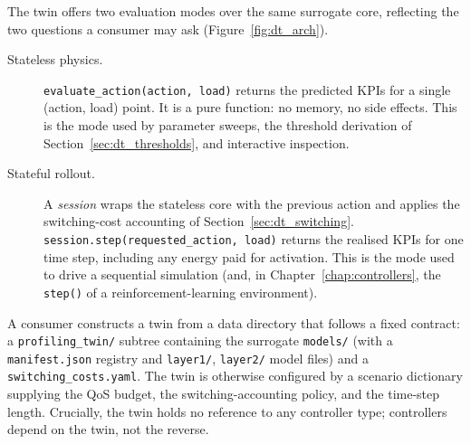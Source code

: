\documentclass[12pt, a4paper]{report}
\newcommand{\code}[1]{\texttt{#1}}
\begin{document}
The twin offers two evaluation modes over the same surrogate core, reflecting
the two questions a consumer may ask (Figure~\ref{fig:dt_arch}).

\begin{description}
  \item[Stateless physics.] \code{evaluate\_action(action, load)} returns the
    predicted KPIs for a single (action, load) point. It is a pure function:
    no memory, no side effects. This is the mode used by parameter sweeps, the
    threshold derivation of Section~\ref{sec:dt_thresholds}, and interactive
    inspection.
  \item[Stateful rollout.] A \emph{session} wraps the stateless core with the
    previous action and applies the switching-cost accounting of
    Section~\ref{sec:dt_switching}. \code{session.step(requested\_action,
    load)} returns the realised KPIs for one time step, including any energy
    paid for activation. This is the mode used to drive a sequential
    simulation (and, in Chapter~\ref{chap:controllers}, the \code{step()} of
    a reinforcement-learning environment).
\end{description}

A consumer constructs a twin from a data directory that follows a fixed
contract: a \code{profiling\_twin/} subtree containing the surrogate
\code{models/} (with a \code{manifest.json} registry and \code{layer1/},
\code{layer2/} model files) and a \code{switching\_costs.yaml}. The twin is
otherwise configured by a scenario dictionary supplying the QoS budget, the
switching-accounting policy, and the time-step length. Crucially, the twin
holds no reference to any controller type; controllers depend on the twin, not
the reverse.
\end{document}
